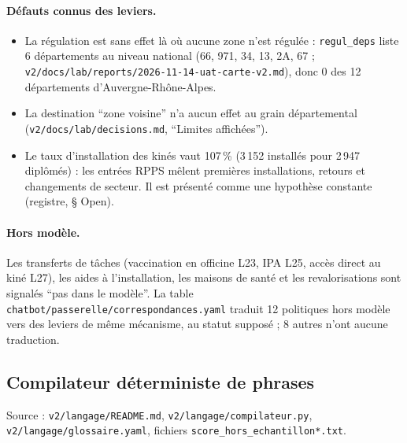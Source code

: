 \paragraph{Défauts connus des leviers.}
\begin{itemize}
\item La régulation est sans effet là où aucune zone n'est régulée : \texttt{regul\_\allowbreak{}deps} liste 6\mesure{} départements au niveau national (66, 971, 34, 13, 2A, 67 ; \texttt{v2/\allowbreak{}docs/\allowbreak{}lab/\allowbreak{}reports/\allowbreak{}2026-\allowbreak{}11-\allowbreak{}14-\allowbreak{}uat-\allowbreak{}carte-\allowbreak{}v2.md}), donc 0\derive{} des 12\mesure{} départements d'Auvergne-Rhône-Alpes.
\item La destination \enquote{zone voisine} n'a aucun effet au grain départemental (\texttt{v2/\allowbreak{}docs/\allowbreak{}lab/\allowbreak{}decisions.md}, \enquote{Limites affichées}).
\item Le taux d'installation des kinés vaut 107\mesure{}\,\% (3\,152\mesure{} installés pour 2\,947\mesure{} diplômés) : les entrées RPPS mêlent premières installations, retours et changements de secteur. Il est présenté comme une hypothèse constante (registre, § Open).
\end{itemize}

\paragraph{Hors modèle.}
Les transferts de tâches (vaccination en officine L23, IPA L25, accès direct au kiné L27), les aides à l'installation, les maisons de santé et les revalorisations sont signalés \enquote{pas dans le modèle}.
La table \texttt{chatbot/\allowbreak{}passerelle/\allowbreak{}correspondances.yaml} traduit 12\mesure{} politiques hors modèle vers des leviers de même mécanisme, au statut supposé ; 8\mesure{} autres n'ont aucune traduction.

\subsection{Compilateur déterministe de phrases}\label{pro:compilateur}

Source : \texttt{v2/\allowbreak{}langage/\allowbreak{}README.md}, \texttt{v2/\allowbreak{}langage/\allowbreak{}compilateur.py}, \texttt{v2/\allowbreak{}langage/\allowbreak{}glossaire.yaml}, fichiers \texttt{score\_\allowbreak{}hors\_\allowbreak{}echantillon*.txt}.

